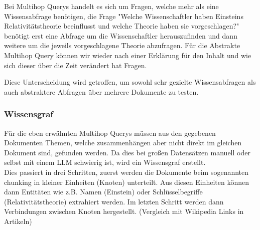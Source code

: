 Bei Multihop Querys handelt es sich um Fragen, welche mehr als eine Wissensabfrage benötigen, die Frage "Welche Wissenschaftler haben Einsteins Relativitätstheorie beeinflusst und welche Theorie haben sie vorgeschlagen?" benötigt erst eine Abfrage um die Wissenschaftler herauszufinden und dann weitere um die jeweils vorgeschlagene Theorie abzufragen.
Für die Abstrakte Multihop Query können wir wieder nach einer Erklärung für den Inhalt und wie sich dieser über die Zeit verändert hat Fragen.

Diese Unterscheidung wird getroffen, um sowohl sehr gezielte Wissensabfragen als auch abstraktere Abfragen über mehrere Dokumente zu testen.


\subsubsection{Wissensgraf}


Für die eben erwähnten Multihop Querys müssen aus den gegebenen Dokumenten Themen, welche zusammenhängen aber nicht direkt im gleichen Dokument sind, gefunden werden.
Da dies bei großen Datensätzen manuell oder selbst mit einem LLM schwierig ist, wird ein Wissensgraf erstellt. \\
Dies passiert in drei Schritten, zuerst werden die Dokumente beim sogenannten chunking in kleiner Einheiten (Knoten) unterteilt.
Aus diesen Einheiten können dann Entitäten wie z.B. Namen (Einstein) oder Schlüsselbegriffe (Relativitätstheorie) extrahiert werden.
Im letzten Schritt werden dann Verbindungen zwischen Knoten hergestellt. (Vergleich mit Wikipedia Links in Artikeln)


